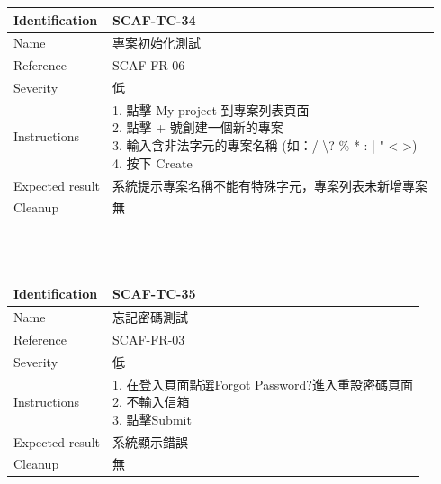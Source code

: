 \documentclass{report}
\begin{document}
\begin{tabularx}{\textwidth}{
  |p{}%
  |p{}|%
  }
  \hline
  \centering Identification &  SCAF-TC-34 \\
  \hline
  \centering Name & 專案初始化測試 \\
  \hline
  \centering Reference & SCAF-FR-06 \\
  \hline
  \centering Severity & 低 \\
  \hline
  \centering Instructions & 
  \makecell[l]{
    1. 點擊 My project 到專案列表頁面 \\
    2. 點擊 + 號創建一個新的專案 \\
    3. 輸入含非法字元的專案名稱 
    (如：/ \textbackslash ? \% * : |  " < >) \\
    4. 按下 Create
  }\\
  \hline
  \centering Expected result & 系統提示專案名稱不能有特殊字元，專案列表未新增專案 \\
  \hline
  \centering Cleanup & 無 \\
  \hline
\end{tabularx}
\\
\newline
\\
\begin{tabularx}{\textwidth}{
  |p{}%
  |p{}|%
  }
  \hline
  \centering Identification &  SCAF-TC-35 \\
  \hline
  \centering Name & 忘記密碼測試 \\
  \hline
  \centering Reference & SCAF-FR-03 \\
  \hline
  \centering Severity & 低 \\
  \hline
  \centering Instructions & 
  \makecell[l]{
    1. 在登入頁面點選Forgot Password?進入重設密碼頁面 \\
    2. 不輸入信箱  \\
    3. 點擊Submit \\
  }\\
  \hline
  \centering Expected result & 系統顯示錯誤 \\
  \hline
  \centering Cleanup & 無 \\
  \hline
\end{tabularx}
\\
\newline
\\
\end{document}
